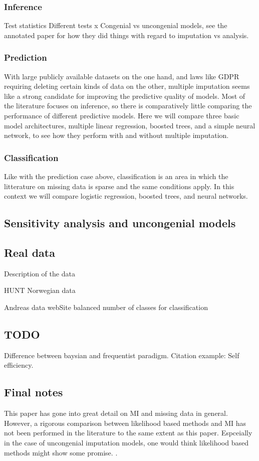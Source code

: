 \documentclass{article}
\begin{document}
	\subsubsection{Inference}
	Test statistics
	Different tests
	x
	Congenial vs uncongenial models, see the annotated paper for how they did things with regard to imputation vs analysis. 
	
	\subsubsection{Prediction}
	With large publicly available datasets on the one hand, and laws like GDPR requiring deleting certain kinds of data on the other, multiple imputation seems like a strong candidate for improving the predictive quality of models. Most of the literature focuses on inference, so there is comparatively little comparing the performance of different predictive models. Here we will compare three basic model architectures, multiple linear regression, boosted trees, and a simple neural network, to see how they perform with and without multiple imputation.
	
	
	
	
	\subsubsection{Classification}
	Like with the prediction case above, classification is an area in which the litterature on missing data is sparse and the same conditions apply. In this context we will compare logistic regression, boosted trees, and neural networks.
	
	
	\subsection{Sensitivity analysis and uncongenial models}
	
	\subsection{Real data}
	
	Description of the data
	
	HUNT Norwegian data
	
	Andreas data webSite
	balanced number of classes for classification
	
	
	\subsection{TODO}
	Difference between baysian and frequentist paradigm.
	Citation example:
	Self efficiency.
	
	\subsection{Final notes}
	This paper has gone into great detail on MI and missing data in general. However, a rigorous comparison between likelihood based methods and MI has not been performed in the literature to the same extent as this paper. Espceially in the case of uncongenial imputation models, one would think likelihood based methods might show some promise.
	\cite[P.10]{grund_pooling_2016}.

		
	
	
\end{document}
